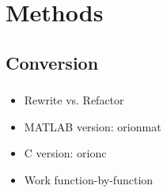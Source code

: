 \documentclass{beamer}
\begin{document}

\section{Methods}

\subsection{Conversion}
\begin{frame}\frametitle{\subsecname}
	\begin{itemize}
		\item<1-> Rewrite vs. Refactor
		\item<2-> MATLAB version: \gls{orionmat}
		\item<2-> C version: \gls{orionc}
		\item<3-> Work function-by-function
	\end{itemize}
\end{frame}
\end{document}
